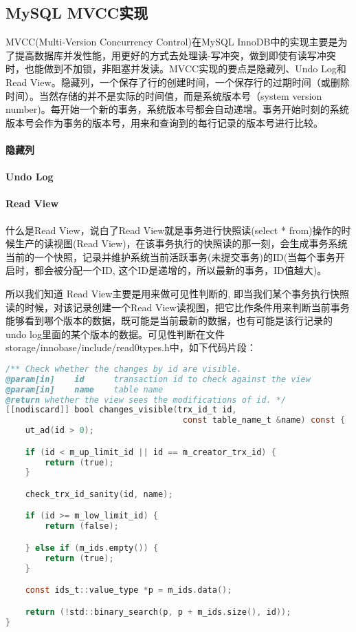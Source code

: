\documentclass[../../../interview-questions.tex]{subfiles}
\begin{document}
\subsection{MySQL MVCC实现}

MVCC(Multi-Version Concurrency Control)在MySQL InnoDB中的实现主要是为了提高数据库并发性能，用更好的方式去处理读-写冲突，做到即使有读写冲突时，也能做到不加锁，非阻塞并发读。MVCC实现的要点是隐藏列、Undo Log和Read View。隐藏列，一个保存了行的创建时间，一个保存行的过期时间（或删除时间）。当然存储的并不是实际的时间值，而是系统版本号（system version number)。每开始一个新的事务，系统版本号都会自动递增。事务开始时刻的系统版本号会作为事务的版本号，用来和查询到的每行记录的版本号进行比较。

\paragraph{隐藏列}

\paragraph{Undo Log}

\paragraph{Read View}

什么是Read View，说白了Read View就是事务进行快照读(select * from)操作的时候生产的读视图(Read View)，在该事务执行的快照读的那一刻，会生成事务系统当前的一个快照，记录并维护系统当前活跃事务(未提交事务)的ID(当每个事务开启时，都会被分配一个ID, 这个ID是递增的，所以最新的事务，ID值越大)。

所以我们知道 Read View主要是用来做可见性判断的, 即当我们某个事务执行快照读的时候，对该记录创建一个Read View读视图，把它比作条件用来判断当前事务能够看到哪个版本的数据，既可能是当前最新的数据，也有可能是该行记录的undo log里面的某个版本的数据。可见性判断在文件storage/innobase/include/read0types.h中，如下代码片段：

\begin{lstlisting}[language=C]
/** Check whether the changes by id are visible.
@param[in]    id      transaction id to check against the view
@param[in]    name    table name
@return whether the view sees the modifications of id. */
[[nodiscard]] bool changes_visible(trx_id_t id,
                                    const table_name_t &name) const {
    ut_ad(id > 0);

    if (id < m_up_limit_id || id == m_creator_trx_id) {
        return (true);
    }

    check_trx_id_sanity(id, name);

    if (id >= m_low_limit_id) {
        return (false);

    } else if (m_ids.empty()) {
        return (true);
    }

    const ids_t::value_type *p = m_ids.data();

    return (!std::binary_search(p, p + m_ids.size(), id));
}
\end{lstlisting}
\end{document}
